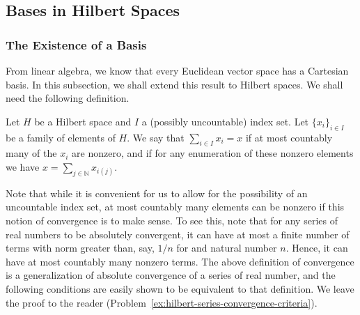 \subsection{Bases in Hilbert Spaces}\label{sec:bases-hilbert-spaces}

\subsubsection{The Existence of a Basis}\label{subsec:hilbert-basis-existence}

From linear algebra, we know that every Euclidean vector space has a Cartesian basis. In this subsection, we shall extend this result to Hilbert spaces. We shall need the following definition.

\begin{Definition}
\label{def:unordered-hilbert-series-sum}
Let $H$ be a Hilbert space and $I$ a (possibly uncountable) index set. Let $\{x_i\}_{i\in I}$ be a family of elements of $H$. We say that $\sum_{i\in I}x_i=x$ if at most countably many of the $x_i$ are nonzero, and if for any enumeration of these nonzero elements we have $x=\sum_{j\in\mathbb{N}}x_{i(j)}$.
\end{Definition}

\begin{Remark}
\label{rem:unordered-series-countability}
Note that while it is convenient for us to allow for the possibility of an uncountable index set, at most countably many elements can be nonzero if this notion of convergence is to make sense. To see this, note that for any series of real numbers to be absolutely convergent, it can have at most a finite number of terms with norm greater than, say, $1/n$ for and natural number $n$. Hence, it can have at most countably many nonzero terms. The above definition of convergence is a generalization of absolute convergence of a series of real number, and the following conditions are easily shown to be equivalent to that definition. We leave the proof to the reader (Problem~\ref{ex:hilbert-series-convergence-criteria}).
\end{Remark}


